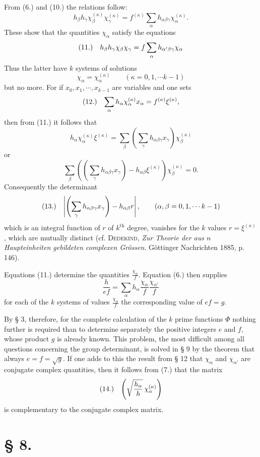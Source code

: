 \documentclass[11pt]{article}
\makeatletter
\newcommand{\frobtagc}[2]{\[\begin{array}{@{}r@{\quad}c@{}}\textup{(#1)} & \displaystyle #2\end{array}\]}
\makeatother
\begin{document}
From (6.) and (10.) the relations follow:
\[
h_\beta h_\gamma\chi_\beta^{(\kappa)}\chi_\gamma^{(\kappa)}=f^{(\kappa)}\sum_\alpha h_{\alpha\beta\gamma}\chi_\alpha^{(\kappa)}.
\]
These show that the quantities $\chi_\alpha$ satisfy the equations
\frobtagc{11.}{h_\beta h_\gamma\chi_\beta\chi_\gamma=f\sum_\alpha h_{\alpha'\beta\gamma}\chi_\alpha}
Thus the latter have $k$ systems of solutions
\[
\chi_\alpha=\chi_\alpha^{(\kappa)}\qquad(\kappa=0,1,\cdots k-1)
\]
but no more. For if $x_0,x_1,\cdots,x_{k-1}$ are variables and one sets
\frobtagc{12.}{\sum_\alpha h_\alpha\chi_\alpha^{(\kappa)}x_\alpha=f^{(\kappa)}\xi^{(\kappa)},}
then from (11.) it follows that
\[
h_\alpha\chi_\alpha^{(\kappa)}\xi^{(\kappa)}=\sum_\beta\left(\sum_\gamma h_{\alpha\beta\gamma}x_\gamma\right)\chi_\beta^{(\kappa)}
\]
or
\[
\sum_\beta\left(\left(\sum_\gamma h_{\alpha\beta\gamma}x_\gamma\right)-h_{\alpha\beta}\xi^{(\kappa)}\right)\chi_\beta^{(\kappa)}=0.
\]
Consequently the determinant
\frobtagc{13.}{\left|\left(\sum_\gamma h_{\alpha\beta\gamma}x_\gamma\right)-h_{\alpha\beta}r\right|,\qquad(\alpha,\beta=0,1,\cdots k-1)}
which is an integral function of $r$ of $k^{\mathrm{th}}$ degree, vanishes for the $k$ values $r=\xi^{(\kappa)}$, which are mutually distinct (cf. \textsc{Dedekind}, \emph{Zur Theorie der aus $n$ Haupteinheiten gebildeten complexen Grössen}. Göttinger Nachrichten 1885, p. 146).

Equations (11.) determine the quantities $\frac{\chi_\alpha}{f}$. Equation (6.) then supplies
\[
\frac{h}{ef}=\sum_\alpha h_\alpha\frac{\chi_\alpha}{f}\frac{\chi_{\alpha'}}{f}
\]
for each of the $k$ systems of values $\frac{\chi_\alpha}{f}$ the corresponding value of $ef=g$.

By § 3, therefore, for the complete calculation of the $k$ prime functions $\Phi$ nothing further is required than to determine separately the positive integers $e$ and $f$, whose product $g$ is already known. This problem, the most difficult among all questions concerning the group determinant, is solved in § 9 by the theorem that always $e=f=\sqrt{g}$. If one adds to this the result from § 12 that $\chi_\alpha$ and $\chi_{\alpha'}$ are conjugate complex quantities, then it follows from (7.) that the matrix
\frobtagc{14.}{\left(\sqrt{\frac{h_\alpha}{h}}\,\chi_\alpha^{(\kappa)}\right)}
is complementary to the conjugate complex matrix.

\section*{§ 8.}
\end{document}
